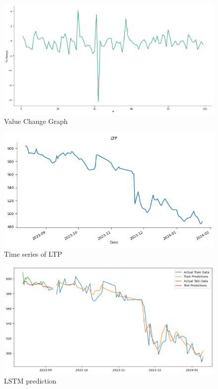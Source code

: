 \documentclass[./main.tex]{subfiles}
\begin{document}
\begin{figure}[H]
    \centering
    \includegraphics[width=1\linewidth]{images/change-graph.png}
    \caption{Value Change Graph}
    \label{fig:7.3}
\end{figure}
\begin{figure}[H]
    \centering
    \includegraphics[width=1\linewidth]{images/LTP.png}
    \caption{Time series of LTP}
    \label{fig:7.4}
\end{figure}
\begin{figure}[H]
    \centering
    \includegraphics[width=1\linewidth]{images/Trained.png}
    \caption{LSTM prediction}
    \label{fig:7.5}
\end{figure}
\end{document}
